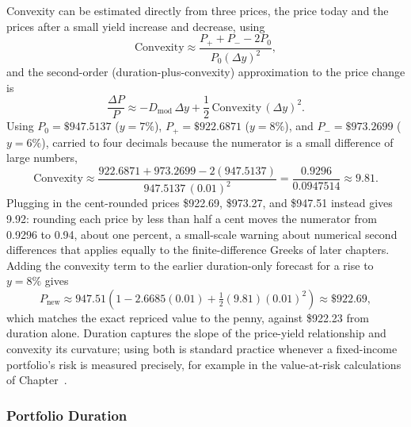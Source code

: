 \documentclass[../ai_in_finance]{subfiles}
\begin{document}
Convexity can be estimated directly from three prices, the price today and the prices after a small yield increase and decrease, using
\begin{equation*}
\text{Convexity} \approx \frac{P_{+} + P_{-} - 2P_0}{P_0 (\Delta y)^2},
\end{equation*}
and the second-order (duration-plus-convexity) approximation to the price change is
\begin{equation*}
\frac{\Delta P}{P} \approx -D_{\text{mod}} \, \Delta y + \frac{1}{2}\,\text{Convexity} \,(\Delta y)^2.
\end{equation*}
Using $P_0 = \$947.5137$ ($y{=}7\%$), $P_{+} = \$922.6871$ ($y{=}8\%$), and $P_{-} = \$973.2699$ ($y{=}6\%$), carried to four decimals because the numerator is a small difference of large numbers,
\begin{equation*}
\text{Convexity} \approx \frac{922.6871 + 973.2699 - 2(947.5137)}{947.5137 \,(0.01)^2} = \frac{0.9296}{0.0947514} \approx 9.81.
\end{equation*}
Plugging in the cent-rounded prices \$922.69, \$973.27, and \$947.51 instead gives 9.92: rounding each price by less than half a cent moves the numerator from 0.9296 to 0.94, about one percent, a small-scale warning about numerical second differences that applies equally to the finite-difference Greeks of later chapters.
Adding the convexity term to the earlier duration-only forecast for a rise to $y=8\%$ gives
\begin{equation*}
P_{\text{new}} \approx 947.51\left(1 - 2.6685(0.01) + \tfrac{1}{2}(9.81)(0.01)^2\right) \approx \$922.69,
\end{equation*}
which matches the exact repriced value to the penny, against \$922.23 from duration alone. Duration captures the slope of the price-yield relationship and convexity its curvature; using both is standard practice whenever a fixed-income portfolio's risk is measured precisely, for example in the value-at-risk calculations of Chapter~.

\subsubsection*{Portfolio Duration}
\end{document}
